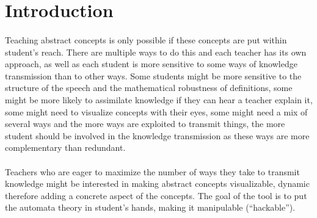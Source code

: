 \section{Introduction}

\paragraph{}
Teaching abstract concepts is only possible if these concepts are put within student's reach. There are multiple ways to do this and each teacher has its own approach, as well as each student is more sensitive to some ways of knowledge transmission than to other ways. Some students might be more sensitive to the structure of the speech and the mathematical robustness of definitions, some might be more likely to assimilate knowledge if they can hear a teacher explain it, some might need to visualize concepts with their eyes, some might need a mix of several ways and the more ways are exploited to transmit things, the more student should be involved in the knowledge transmission as these ways are more complementary than redundant.


\paragraph{}
Teachers who are eager to maximize the number of ways they take to transmit knowledge might be interested in making abstract concepts visualizable, dynamic therefore adding a concrete aspect of the concepts. The goal of the tool is to put the automata theory in student's hands, making it manipulable (``hackable'').

